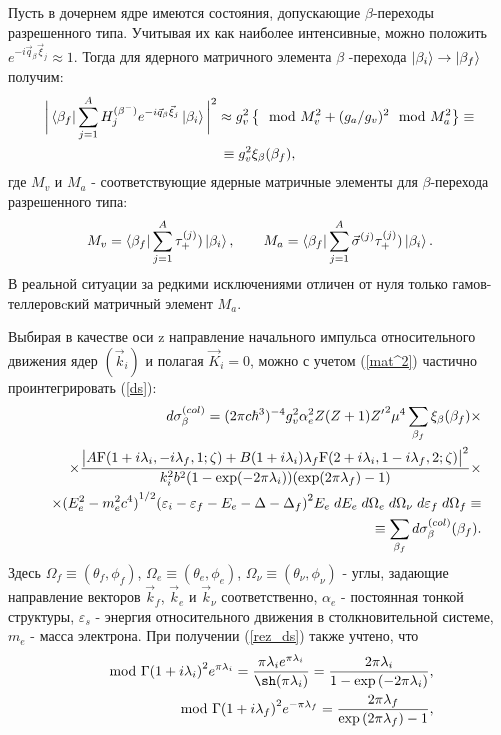 \documentclass[14pt, a4paper]{article}
\numberwithin{figure}{section}
\numberwithin{equation}{section}
\begin{document}
Пусть в дочернем ядре имеются состояния,
допускающие $\beta$-переходы разрешенного типа. Учитывая их как
наиболее интенсивные, можно положить $e^{-i\vec q_\beta\vec\xi_{j}}{\approx}1$.
Тогда для ядерного матричного элемента  $\beta$ -перехода
$\ket{\beta_i}\to\ket{\beta_f}$ получим:
\begin{multline}\label{mat_nuc}
\bigg|\bra{\beta_f }  \sum_{j=1}^A H^{(\beta^-)}_{j}
e^{-i\vec q_\beta\vec\xi_{j}}\ket{ \beta_i}\bigg|^2\approx
g^2_v\left\{\mod{M_v}^2+(g_a/g_v)^2\mod{M_a}^2\right\}\equiv\\
\equiv
g^2_v \xi_\beta(\beta_f),
\end{multline}
где  $M_v$ и $M_a$ - соответствующие ядерные матричные элементы
для $\beta$-перехода разрешенного типа:
\begin{eqnarray}
M_v=\bra{\beta_f } \sum_{j=1}^A \tau_+^{(j)}) \ket{ \beta_i},\qquad
M_a=\bra{\beta_f } \sum_{j=1}^A \vec\sigma^{(j)}\tau_+^{(j)}) \ket{ \beta_i}.\nonumber
\end{eqnarray}
В реальной ситуации за редкими исключениями отличен от нуля только
гамов-теллеров\-cкий матричный элемент $M_a$.

Выбирая в качестве оси z направление начального импульса относительного движения
ядер $(\vec k_i )$ и полагая $\vec K_i =0 $,  можно  с учетом (\ref{mat^2})
частично  проинтегрировать (\ref{ds}):
\begin{eqnarray}\label{rez_ds}
&&d\sigma^{(col)}_\beta=
(2 \pi c \hbar^3)^{-4}
g_v^2 \alpha_e^2 Z (Z+1) {Z'}^2 \mu^4
\sum_{\beta_f}\xi_\beta(\beta_f)\times\nonumber\\
&&\times {{\big| A {\rm F} (1+i \lambda_i,-i \lambda_f,1;\zeta) + B (1+i \lambda_i)\lambda_f
		{\rm F} (2+i \lambda_i,1-i \lambda_f,2;\zeta)\big|^2}\over{ k_i^2 b^2
		(1-\exp(-2\pi\lambda_i))(\exp(2\pi\lambda_f)-1)}}\times\nonumber\\
&&\times {(E_e^2 - m_e^2 c^4)}^{1/2}{(\varepsilon_i - \varepsilon_f - E_e - \Delta
	- \Delta_f)}^2  E_e \;dE_e \; d\Omega_e \; d\Omega_{\nu}\;d\varepsilon_f \; d\Omega_f \equiv\nonumber\\
&&\equiv \sum_{\beta_f} d\sigma^{(col)}_\beta (\beta_f).
\end{eqnarray}
Здесь $\Omega_f\equiv (\theta_f,\phi_f)$, $\Omega_e\equiv (\theta_e,\phi_e)$,
$\Omega_\nu\equiv (\theta_\nu,\phi_\nu)$ - углы, задающие направление
векторов ${\vec k}_f$, ${\vec k}_e$ и ${\vec k}_\nu$ соответственно,
$\alpha_e$ - постоянная тонкой
структуры, $\varepsilon_s$ - энергия относительного движения в столкновительной
системе, $m_e$ - масса электрона. При получении (\ref{rez_ds}) также учтено, что
\begin{eqnarray}
&&\mod{\Gamma{(1+i\lambda_i)}}^2 e^{\pi\lambda_i} = {{\pi\lambda_i e^{\pi\lambda_i}}
	\over{\sh (\pi\lambda_i)}} = {{2 \pi\lambda_i}\over{1- \exp{(-2\pi\lambda_i)}}},\nonumber\\
&&\mod{\Gamma{(1+i\lambda_f)}}^2 e^{- \pi\lambda_f} = {{2 \pi\lambda_f}\over{\exp{(2 \pi\lambda_f)-1}}},
\end{eqnarray}
\end{document}

